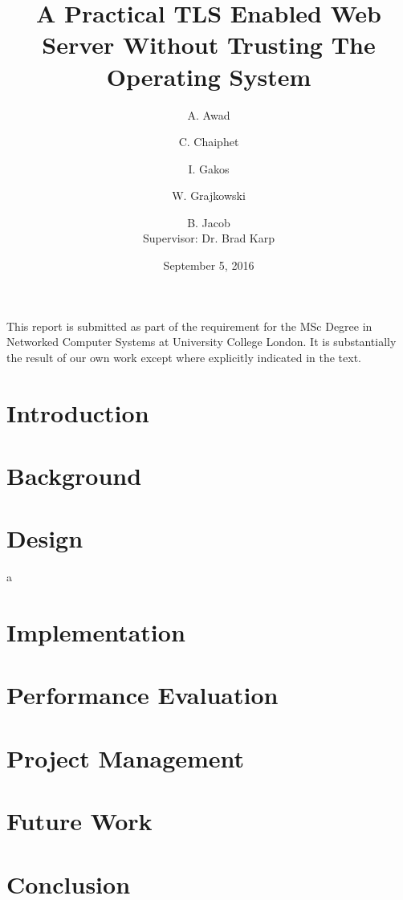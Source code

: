 \documentclass{article}
\title{A Practical TLS Enabled Web Server Without Trusting The Operating
System}
\author{A. Awad}
\author{C. Chaiphet}
\author{I. Gakos}
\author{W. Grajkowski}
\author{B. Jacob \\\small Supervisor: Dr. Brad Karp}
\date{September 5, 2016}
\affil{MSc in Networked Computer Systems \\University College London}
\begin{document}

\begin{titlepage}
  \maketitle
  \vfill \tiny
  \noindent
  This report is submitted as part of the requirement for the MSc
  Degree in Networked Computer Systems at University College
  London. It is substantially the result of our own work except where
  explicitly indicated in the text.
\end{titlepage}


\begin{abstract}
  
\end{abstract}
\newpage

\tableofcontents
\newpage


\section{Introduction}
\label{sec:introduction}

\newpage

\section{Background}
\label{sec:background}

\newpage

\section{Design}
\label{sec:design}
a
\newpage

\section{Implementation}
\label{sec:implementation}

\newpage

\section{Performance Evaluation}
\label{sec:perfeval}

\newpage

\section{Project Management}
\label{sec:projectmgmt}

\newpage

\section{Future Work}
\label{sec:futurework}

\newpage


\section{Conclusion}
\label{sec:conclusion}

\newpage

\printbibliography
\end{document}
